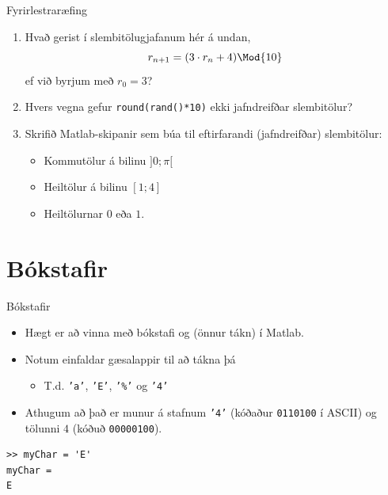 \documentclass[handout]{beamer}
\begin{document}
\begin{frame}{Fyrirlestraræfing}
\begin{enumerate}
 \item Hvað gerist í slembitölugjafanum hér á undan, 
 \[
  r_{n+1} = (3\cdot r_n + 4) \Mod{10}
 \]
 ef við byrjum með $r_0 = 3$?
 \item Hvers vegna gefur \texttt{round(rand()*10)} ekki jafndreifðar slembitölur?
 \item Skrifið Matlab-skipanir sem búa til eftirfarandi (jafndreifðar) slembitölur:
 \begin{itemize}
  \item Kommutölur á bilinu $]0;\pi[$
  \item Heiltölur á bilinu $[1;4]$
  \item Heiltölurnar $0$ eða $1$.
 \end{itemize}
\end{enumerate}
\end{frame}

\section{Bókstafir}

\begin{frame}[fragile]{Bókstafir}
\begin{itemize}
 \item Hægt er að vinna með bókstafi og (önnur tákn) í Matlab.
 \item Notum einfaldar gæsalappir til að tákna þá
 \begin{itemize}
  \item T.d. \texttt{'a'}, \texttt{'E'}, \texttt{'\%'} og \texttt{'4'}
 \end{itemize}
 \item Athugum að það er munur á stafnum \texttt{'4'} (kóðaður \texttt{0110100} í ASCII) og tölunni $4$ (kóðuð \texttt{00000100}).
\end{itemize}
\begin{verbatim}
>> myChar = 'E'
myChar =
E
\end{verbatim}
\end{frame}
\end{document}
